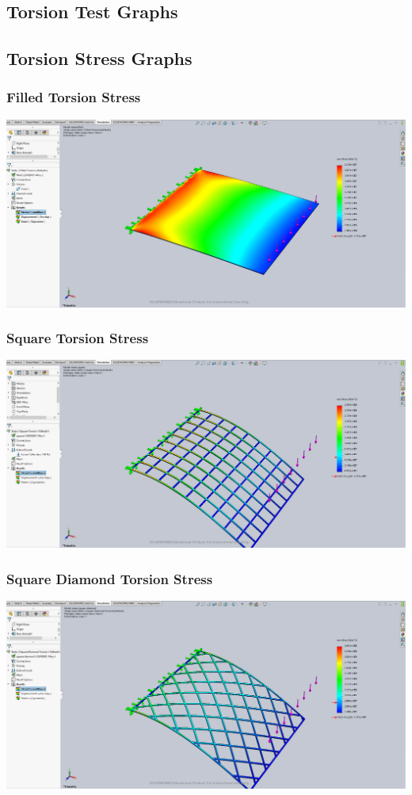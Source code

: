 \documentclass[12pt, letterpaper]{article}
\begin{document}
\begin{singlespace}
\section{Torsion Test Graphs}
\label{ap:to}



\subsection{Torsion Stress Graphs}
\label{ap:to-vm}


\subsubsection{Filled Torsion Stress}
\label{ap:f-to-vm}
\includegraphics[width=0.8\linewidth]{./graphs/torsion/filled-torsion-stress}

\subsubsection{Square Torsion Stress}
\label{ap:s-to-vm}
\includegraphics[width=0.8\linewidth]{./graphs/torsion/square-torsion-stress}

\subsubsection{Square Diamond Torsion Stress}
\label{ap:sd-to-vm}
\includegraphics[width=0.8\linewidth]{./graphs/torsion/square-diamond-torsion-stress}


\end{singlespace}
\end{document}
